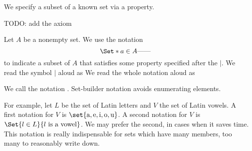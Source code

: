 

We specify a
subset of a known
set via a property.


TODO: add the axiom

Let $A$ be a nonempty set.
We use the notation
\[
  \Set*{a \in A}{\text{------}\;}
\]
to indicate a subset of $A$ that
satisfies some property specified
after the $\mid$.
We read the symbol $\mid$ aloud as
We read the whole notation aloud as

We call the notation
.
Set-builder notation avoids enumerating
elements.


For example, let $L$
be the set of Latin letters
and $V$ the set of Latin
vowels.
A first notation for $V$ is
$\set{\text{a},\text{e},\text{i},\text{o},\text{u}}$.
A second notation for $V$ is
$\Set{l \in L}{l \text{ is a vowel}}$.
We may prefer the second, in cases
when it saves time.
This notation is really indispensable for
sets which have many members, too many
to reasonably write down.


